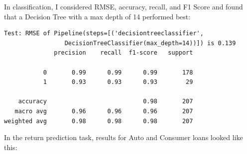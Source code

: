 \documentclass{article}
\begin{document}
In classification, I considered RMSE, accuracy, recall, and F1 Score and found that a Decision Tree with a max depth of 14 performed best: 

\begin{verbatim}
Test: RMSE of Pipeline(steps=[('decisiontreeclassifier',
                 DecisionTreeClassifier(max_depth=14))]) is 0.139
              precision    recall  f1-score   support

           0       0.99      0.99      0.99       178
           1       0.93      0.93      0.93        29

    accuracy                           0.98       207
   macro avg       0.96      0.96      0.96       207
weighted avg       0.98      0.98      0.98       207
\end{verbatim}

In the return prediction task, results for Auto and Consumer loans looked like this: 
\end{document}
